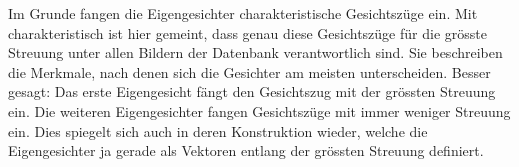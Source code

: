 Im Grunde fangen die Eigengesichter charakteristische Gesichtszüge ein.
Mit charakteristisch ist hier gemeint, dass genau diese Gesichtszüge für die grösste Streuung unter allen Bildern der Datenbank verantwortlich sind.
Sie beschreiben die Merkmale, nach denen sich die Gesichter am meisten unterscheiden.
Besser gesagt: Das erste Eigengesicht fängt den Gesichtszug mit der grössten Streuung ein.
Die weiteren Eigengesichter fangen Gesichtszüge mit immer weniger Streuung ein.
Dies spiegelt sich auch in deren Konstruktion wieder, welche die Eigengesichter ja gerade als Vektoren entlang der grössten Streuung definiert.

